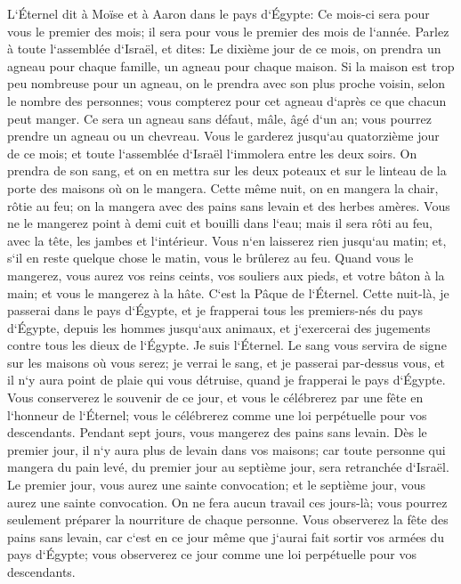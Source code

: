 \verse L`Éternel dit à Moïse et à Aaron dans le pays d`Égypte: 
\verse Ce mois-ci sera pour vous le premier des mois; il sera pour vous le premier des mois de l`année. 
\verse Parlez à toute l`assemblée d`Israël, et dites: Le dixième jour de ce mois, on prendra un agneau pour chaque famille, un agneau pour chaque maison. 
\verse Si la maison est trop peu nombreuse pour un agneau, on le prendra avec son plus proche voisin, selon le nombre des personnes; vous compterez pour cet agneau d`après ce que chacun peut manger. 
\verse Ce sera un agneau sans défaut, mâle, âgé d`un an; vous pourrez prendre un agneau ou un chevreau. 
\verse Vous le garderez jusqu`au quatorzième jour de ce mois; et toute l`assemblée d`Israël l`immolera entre les deux soirs. 
\verse On prendra de son sang, et on en mettra sur les deux poteaux et sur le linteau de la porte des maisons où on le mangera. 
\verse Cette même nuit, on en mangera la chair, rôtie au feu; on la mangera avec des pains sans levain et des herbes amères. 
\verse Vous ne le mangerez point à demi cuit et bouilli dans l`eau; mais il sera rôti au feu, avec la tête, les jambes et l`intérieur. 
\verse Vous n`en laisserez rien jusqu`au matin; et, s`il en reste quelque chose le matin, vous le brûlerez au feu. 
\verse Quand vous le mangerez, vous aurez vos reins ceints, vos souliers aux pieds, et votre bâton à la main; et vous le mangerez à la hâte. C`est la Pâque de l`Éternel. 
\verse Cette nuit-là, je passerai dans le pays d`Égypte, et je frapperai tous les premiers-nés du pays d`Égypte, depuis les hommes jusqu`aux animaux, et j`exercerai des jugements contre tous les dieux de l`Égypte. Je suis l`Éternel. 
\verse Le sang vous servira de signe sur les maisons où vous serez; je verrai le sang, et je passerai par-dessus vous, et il n`y aura point de plaie qui vous détruise, quand je frapperai le pays d`Égypte. 
\verse Vous conserverez le souvenir de ce jour, et vous le célébrerez par une fête en l`honneur de l`Éternel; vous le célébrerez comme une loi perpétuelle pour vos descendants. 
\verse Pendant sept jours, vous mangerez des pains sans levain. Dès le premier jour, il n`y aura plus de levain dans vos maisons; car toute personne qui mangera du pain levé, du premier jour au septième jour, sera retranchée d`Israël. 
\verse Le premier jour, vous aurez une sainte convocation; et le septième jour, vous aurez une sainte convocation. On ne fera aucun travail ces jours-là; vous pourrez seulement préparer la nourriture de chaque personne. 
\verse Vous observerez la fête des pains sans levain, car c`est en ce jour même que j`aurai fait sortir vos armées du pays d`Égypte; vous observerez ce jour comme une loi perpétuelle pour vos descendants. 
